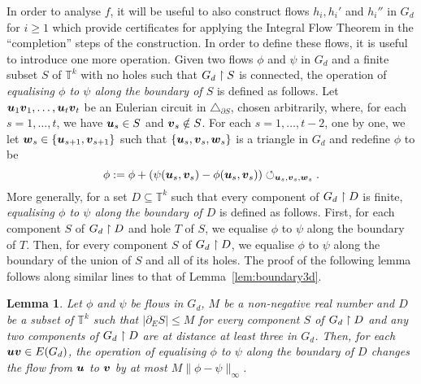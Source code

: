 \documentclass[12pt,a4paper]{amsart}
\numberwithin{equation}{section}
\newtheorem{lemma}[equation]{Lemma}
\theoremstyle{definition}
\begin{document}
In order to analyse $f$, it will be useful to also construct flows $h_i,h_i'$ and $h_i''$ in $G_d$ for $i\geq1$ which provide certificates for applying the Integral Flow Theorem in the ``completion'' steps of the construction. In order to define these flows, it is useful to introduce one more operation. Given two flows $\phi$ and $\psi$ in $G_d$ and a finite subset $S$ of $\mathbb{T}^k$ with no holes such that $G_d\upharpoonright S$ is connected, the operation of \emph{equalising $\phi$ to $\psi$ along the boundary of $S$} is defined as follows. Let $\boldsymbol{u}_1\boldsymbol{v}_1,\dots,\boldsymbol{u}_t\boldsymbol{v}_t$ be an Eulerian circuit in $\triangle_{\partial S}$, chosen arbitrarily, where, for each $s=1,\dots,t$, we have $\boldsymbol{u}_s\in S$ and $\boldsymbol{v}_s\notin S$. For each $s=1,\dots,t-2$, one by one, we let $\boldsymbol{w}_s\in \{\boldsymbol{u}_{s+1},\boldsymbol{v}_{s+1}\}$ such that $\{\boldsymbol{u}_s,\boldsymbol{v}_s,\boldsymbol{w}_s\}$ is a triangle in $G_d$ and redefine $\phi$ to be
\[\phi:=\phi + \left(\psi(\boldsymbol{u}_s,\boldsymbol{v}_s) - \phi(\boldsymbol{u}_s,\boldsymbol{v}_s)\right)\circlearrowleft_{\boldsymbol{u}_s,\boldsymbol{v}_s,\boldsymbol{w}_s}.\]
More generally, for a set $D\subseteq\mathbb{T}^k$ such that every component of $G_d\upharpoonright D$ is finite, \emph{equalising $\phi$ to $\psi$ along the boundary of $D$} is defined as follows. First, for each component $S$ of $G_d\upharpoonright D$ and hole $T$ of $S$, we equalise $\phi$ to $\psi$ along the boundary of $T$. Then, for every component $S$ of $G_d\upharpoonright D$, we equalise $\phi$ to $\psi$ along the boundary of the union of $S$ and all of its holes. The proof of the following lemma follows along similar lines to that of Lemma~\ref{lem:boundary3d}.

\begin{lemma}
\label{lem:boundaryEqualise}
Let $\phi$ and $\psi$ be flows in $G_d$, $M$ be a non-negative real number and $D$ be a subset of $\mathbb{T}^k$ such that $|\partial_ES|\leq M$ for every component $S$ of $G_d\upharpoonright D$ and any two components of $G_d\upharpoonright D$ are at distance at least three in $G_d$. Then, for each $\boldsymbol{u}\boldsymbol{v}\in E(G_d)$, the operation of equalising $\phi$ to $\psi$ along the boundary of $D$ changes the flow from $\boldsymbol{u}$ to $\boldsymbol{v}$ by at most $M\|\phi-\psi\|_\infty$.
\end{lemma}
\end{document}
